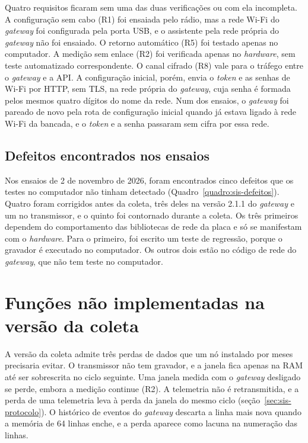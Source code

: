 Quatro requisitos ficaram sem uma das duas verificações ou com ela incompleta. A configuração sem cabo (R1) foi ensaiada pelo rádio, mas a rede Wi-Fi do \textit{gateway} foi configurada pela porta USB, e o assistente pela rede própria do \textit{gateway} não foi ensaiado. O retorno automático (R5) foi testado apenas no computador. A medição sem enlace (R2) foi verificada apenas no \textit{hardware}, sem teste automatizado correspondente. O canal cifrado (R8) vale para o tráfego entre o \textit{gateway} e a API. A configuração inicial, porém, envia o \textit{token} e as senhas de Wi-Fi por HTTP, sem TLS, na rede própria do \textit{gateway}, cuja senha é formada pelos mesmos quatro dígitos do nome da rede. Num dos ensaios, o \textit{gateway} foi pareado de novo pela rota de configuração inicial quando já estava ligado à rede Wi-Fi da bancada, e o \textit{token} e a senha passaram sem cifra por essa rede.

\subsection{Defeitos encontrados nos ensaios}\label{sec:sis-defeitos}

Nos ensaios de 2 de novembro de 2026, foram encontrados cinco defeitos que os testes no computador não tinham detectado (Quadro~\ref{quadro:sis-defeitos}). Quatro foram corrigidos antes da coleta, três deles na versão 2.1.1 do \textit{gateway} e um no transmissor, e o quinto foi contornado durante a coleta. Os três primeiros dependem do comportamento das bibliotecas de rede da placa e só se manifestam com o \textit{hardware}. Para o primeiro, foi escrito um teste de regressão, porque o gravador é executado no computador. Os outros dois estão no código de rede do \textit{gateway}, que não tem teste no computador.

\section{Funções não implementadas na versão da coleta}\label{sec:sis-limites}

A versão da coleta admite três perdas de dados que um nó instalado por meses precisaria evitar. O transmissor não tem gravador, e a janela fica apenas na RAM até ser sobrescrita no ciclo seguinte. Uma janela medida com o \textit{gateway} desligado se perde, embora a medição continue (R2). A telemetria não é retransmitida, e a perda de uma telemetria leva à perda da janela do mesmo ciclo (seção~\ref{sec:sis-protocolo}). O histórico de eventos do \textit{gateway} descarta a linha mais nova quando a memória de \num{64} linhas enche, e a perda aparece como lacuna na numeração das linhas.

